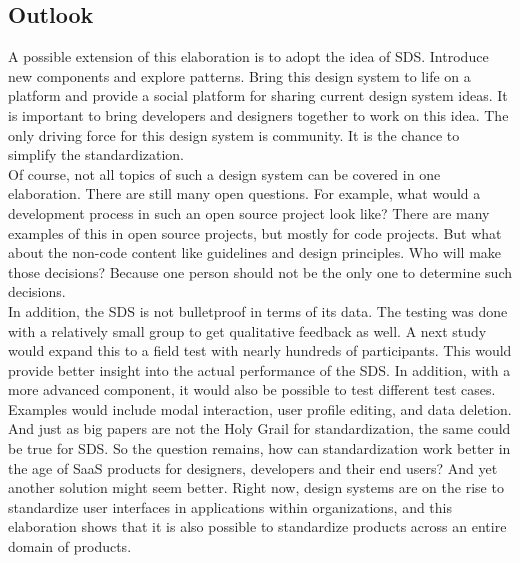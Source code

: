 \subsection{Outlook}
A possible extension of this elaboration is to adopt the idea of \ac{SDS}. Introduce new components and explore patterns. Bring this design system to life on a platform and provide a social platform for sharing current design system ideas. It is important to bring developers and designers together to work on this idea. The only driving force for this design system is community. It is the chance to simplify the standardization. \\
Of course, not all topics of such a design system can be covered in one elaboration. There are still many open questions. For example, what would a development process in such an open source project look like? There are many examples of this in open source projects, but mostly for code projects. But what about the non-code content like guidelines and design principles. Who will make those decisions? Because one person should not be the only one to determine such decisions. \\
In addition, the \ac{SDS} is not bulletproof in terms of its data. The testing was done with a relatively small group to get qualitative feedback as well. A next study would expand this to a field test with nearly hundreds of participants. This would provide better insight into the actual performance of the \ac{SDS}. In addition, with a more advanced component, it would also be possible to test different test cases. Examples would include modal interaction, user profile editing, and data deletion. \\
And just as big papers are not the Holy Grail for standardization, the same could be true for \ac{SDS}. So the question remains, how can standardization work better in the age of \ac{SaaS} products for designers, developers and their end users? And yet another solution might seem better. Right now, design systems are on the rise to standardize user interfaces in applications within organizations, and this elaboration shows that it is also possible to standardize products across an entire domain of products. 